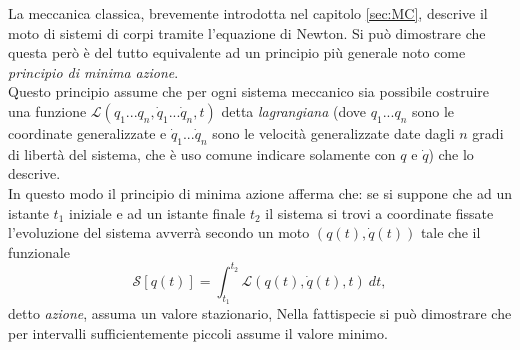 \label{sec:MinimaAzione}
La meccanica classica, brevemente introdotta nel capitolo \ref{sec:MC}, descrive il moto di sistemi di corpi tramite l'equazione di Newton. Si può dimostrare che questa però è del tutto equivalente ad un principio più generale noto come \emph{principio di minima azione}.\\ Questo principio assume che per ogni sistema meccanico sia possibile costruire una funzione $\mathcal{L}(q_1...q_n,\dot{q}_1...\dot{q}_n,t)$ detta \emph{lagrangiana} (dove $q_1...q_n$ sono le coordinate generalizzate e $\dot{q}_1...\dot{q}_n$ sono le velocità generalizzate date dagli $n$ gradi di libertà del sistema, che è uso comune indicare solamente con $q$ e $\dot{q}$) che lo descrive.\\ In questo modo il principio di minima azione afferma che: se si suppone che ad un istante $t_1$ iniziale e ad un istante finale $t_2$ il sistema si trovi a coordinate fissate l'evoluzione del sistema avverrà secondo un moto $(q(t),\dot{q}(t))$ tale che il funzionale 
\begin{equation}
    \label{Azione}
    \mathcal{S}[q(t)] =\int_{t_1}^{t_2} \mathcal{L}(q(t),\dot{q}(t),t)\ dt,
\end{equation}
detto \emph{azione}, assuma un valore stazionario, Nella fattispecie si può dimostrare che per intervalli sufficientemente piccoli assume il valore minimo.\\

